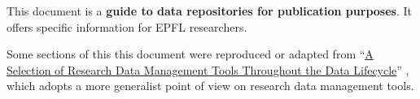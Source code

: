 \noindent This document is a \textbf{guide to data repositories for publication purposes}. It offers specific information for EPFL researchers.

\vspace{0.4cm}

\noindent Some sections of this this document were reproduced or adapted from ``\href{http://infoscience.epfl.ch/record/211157}{A Selection of Research Data Management Tools Throughout the Data Lifecycle}'' \cite{krause_selection_2015}, which adopts a more generalist point of view on research data management tools.

